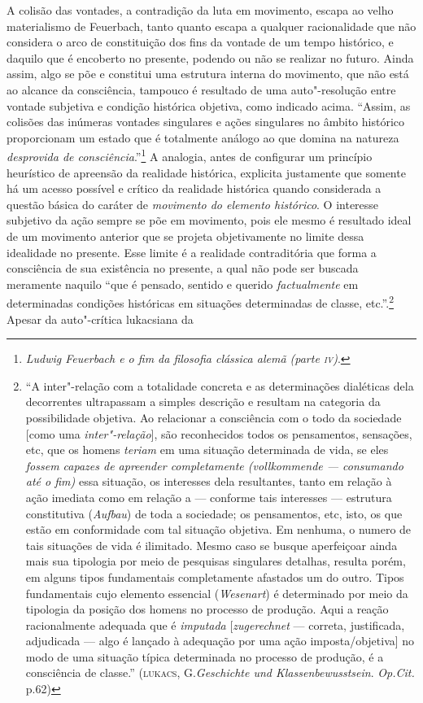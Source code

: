 A colisão das vontades, a contradição da luta em movimento, escapa ao
velho materialismo de Feuerbach, tanto quanto escapa a qualquer
racionalidade que não considera o arco de constituição dos fins da
vontade de um tempo histórico, e daquilo que é encoberto no presente,
podendo ou não se realizar no futuro. Ainda assim, algo se põe e
constitui uma estrutura interna do movimento, que não está ao alcance da
consciência, tampouco é resultado de uma auto"-resolução entre vontade
subjetiva e condição histórica objetiva, como indicado acima. ``Assim,
as colisões das inúmeras vontades singulares e ações singulares no
âmbito histórico proporcionam um estado que é totalmente análogo ao que
domina na natureza \emph{desprovida de consciência}.''\footnote{\emph{Ludwig
  Feuerbach e o fim da filosofia clássica alemã (parte \textsc{iv})}.} A
analogia, antes de configurar um princípio heurístico de apreensão da
realidade histórica, explicita justamente que somente há um acesso
possível e crítico da realidade histórica quando considerada a questão
básica do caráter de \emph{movimento do elemento histórico}. O interesse
subjetivo da ação sempre se põe em movimento, pois ele mesmo é resultado
ideal de um movimento anterior que se projeta objetivamente no limite
dessa idealidade no presente. Esse limite é a realidade contraditória
que forma a consciência de sua existência no presente, a qual não pode
ser buscada meramente naquilo ``que é pensado, sentido e querido
\emph{factualmente} em determinadas condições históricas em situações
determinadas de classe, etc.''.\footnote{``A inter"-relação com a
  totalidade concreta e as determinações dialéticas dela decorrentes
  ultrapassam a simples descrição e resultam na categoria da
  possibilidade objetiva. Ao relacionar a consciência com o todo da
  sociedade {[}como uma \emph{inter"-relação}{]}, são reconhecidos todos
  os pensamentos, sensações, etc, que os homens \emph{teriam} em uma
  situação determinada de vida, se eles \emph{fossem capazes de
  apreender completamente (vollkommende --- consumando até o fim)} essa
  situação, os interesses dela resultantes, tanto em relação à ação
  imediata como em relação a --- conforme tais interesses --- estrutura
  constitutiva (\emph{Aufbau}) de toda a sociedade; os pensamentos, etc,
  isto, os que estão em conformidade com tal situação objetiva. Em
  nenhuma, o numero de tais situações de vida é ilimitado. Mesmo caso se
  busque aperfeiçoar ainda mais sua tipologia por meio de pesquisas
  singulares detalhas, resulta porém, em alguns tipos fundamentais
  completamente afastados um do outro. Tipos fundamentais cujo elemento
  essencial (\emph{Wesenart}) é determinado por meio da tipologia da
  posição dos homens no processo de produção. Aqui a reação
  racionalmente adequada que é \emph{imputada}
  {[}\emph{zugerechnet} --- correta, justificada, adjudicada
  --- algo é lançado à adequação por uma ação
  imposta/objetiva{]} no modo de uma situação típica
  determinada no processo de produção, é a consciência de classe.''
  (\textsc{lukacs}, G.\emph{Geschichte und Klassenbewusstsein}.
  \emph{Op.Cit.} p.62)} Apesar da auto"-crítica lukacsiana da
